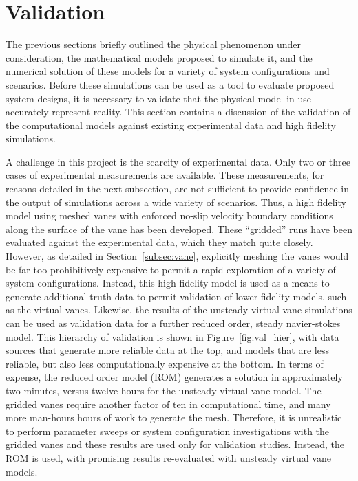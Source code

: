 
\section{Validation}
\label{sec:validation}

%
%
%

%
%

The previous sections briefly outlined the physical phenomenon under
consideration, the mathematical models proposed to simulate it,
and the numerical solution of these models for a variety of system 
configurations and scenarios. Before these simulations can be used 
as a tool to evaluate proposed system designs, it is necessary to
validate that the physical model in use accurately represent
reality. This section contains a discussion of the validation of the
computational models against existing experimental data and high
fidelity simulations. 

A challenge in this project is the scarcity of experimental data. Only
two or three cases of experimental measurements are available. These
measurements, for reasons detailed in the next subsection, are not
sufficient to provide confidence in the output of simulations across a
wide variety  of scenarios. Thus, a high fidelity model using 
meshed vanes with enforced no-slip velocity boundary conditions along
the surface of the vane has been developed. These ``gridded'' runs have
been evaluated against the experimental data, which they match quite
closely. However, as detailed in Section~\ref{subsec:vane}, 
explicitly meshing the vanes would be far too 
prohibitively expensive to permit a rapid exploration of a variety of
system configurations. Instead, this high fidelity model is used as a
means to generate additional truth data to permit validation of lower
fidelity models, such as the virtual vanes. Likewise, the results of the
unsteady virtual vane simulations can be used as validation data for a
further reduced order, steady navier-stokes model. This hierarchy of
validation is shown in Figure~\ref{fig:val_hier}, with data sources that
generate more reliable data at the top, and models that are less
reliable, but also less computationally expensive at the bottom. In
terms of expense, the reduced order model (ROM) generates a solution in
approximately two minutes, versus twelve hours for the unsteady virtual
vane model. The gridded vanes require another factor of ten in
computational time, and many more man-hours hours of work to generate
the mesh. Therefore, it is unrealistic to perform parameter sweeps or
system configuration investigations with the gridded vanes and these
results are used only for validation studies. Instead, the
ROM is used, with promising results re-evaluated with unsteady virtual
vane models. %

